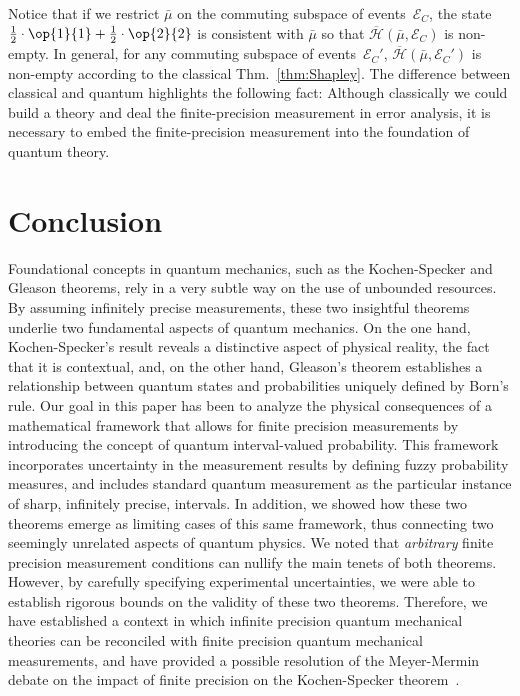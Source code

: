 \documentclass[english,reprint, aps, prl,superscriptaddress, showpacs,
showkeys, longbibliography, amsmath, amssymb, floatfix]{revtex4-1}
\theoremstyle{plain}
\theoremstyle{definition}
\newcommand{\Hilb}{\mathcal{H}}
\newcommand{\events}{\ensuremath{\mathcal{E}}}
\newcommand{\proj}[1]{\op{#1}{#1}}
\newcommand{\coreBorn}{\ensuremath{\overline{\Hilb}}}
\begin{document}
Notice that if we restrict $\bar{\mu}$ on the commuting subspace
of events~$\events_{C}$, the state~$\frac{1}{2}\cdot\proj{1}+\frac{1}{2}\cdot\proj{2}$
is consistent with $\bar{\mu}$ so that $\coreBorn\left(\bar{\mu},\events_{C}\right)$
is non-empty. In general, for any commuting subspace of events~$\events_{C}'$,
$\coreBorn\left(\bar{\mu},\events_{C}'\right)$ is non-empty according
to the classical Thm.~\ref{thm:Shapley}. The difference between
classical and quantum highlights the following fact: Although classically
we could build a theory and deal the finite-precision measurement
in error analysis, it is necessary to embed the finite-precision measurement
into the foundation of quantum theory.

\section{Conclusion}
\label{sec:Conclusion}
  
Foundational concepts in quantum mechanics, such as the Kochen-Specker
and Gleason theorems, rely in a very subtle way on the use of
unbounded resources. By assuming infinitely precise measurements,
these two insightful theorems underlie two fundamental aspects of
quantum mechanics. On the one hand, Kochen-Specker's result reveals a
distinctive aspect of physical reality, the fact that it is
contextual, and, on the other hand, Gleason's theorem establishes a
relationship between quantum states and probabilities uniquely defined
by Born's rule.  Our goal in this paper has been to analyze the
physical consequences of a mathematical framework that allows for
finite precision measurements by introducing the concept of quantum
interval-valued probability. This framework incorporates uncertainty
in the measurement results by defining fuzzy probability measures, and
includes standard quantum measurement as the particular instance of
sharp, infinitely precise, intervals.  In addition, we showed how
these two theorems emerge as limiting cases of this same framework,
thus connecting two seemingly unrelated aspects of quantum physics. We
noted that {\it arbitrary\/} finite precision measurement conditions
can nullify the main tenets of both theorems. However, by carefully
specifying experimental uncertainties, we were able to establish
rigorous bounds on the validity of these two theorems. Therefore, we
have established a context in which infinite precision quantum
mechanical theories can be reconciled with finite precision quantum
mechanical measurements, and have provided a possible resolution of
the Meyer-Mermin debate on the impact of finite precision on the
Kochen-Specker theorem~\cite{PhysRevLett.83.3751,Mermin1999}.



\end{document}
